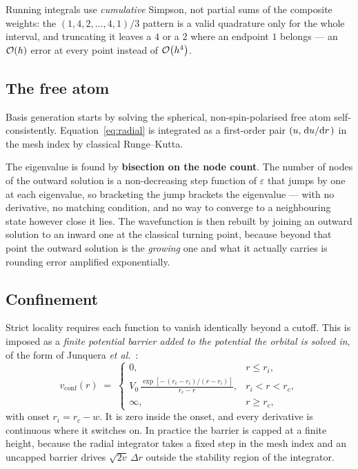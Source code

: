 \documentclass[11pt,a4paper]{article}
\begin{document}
Running integrals use \emph{cumulative} Simpson, not partial sums of the
composite weights: the $(1,4,2,\dots,4,1)/3$ pattern is a valid quadrature
only for the whole interval, and truncating it leaves a $4$ or a $2$ where an
endpoint $1$ belongs --- an $\order{h}$ error at every point instead of
$\order{h^4}$.

\subsection{The free atom}

Basis generation starts by solving the spherical, non-spin-polarised free atom
self-consistently. Equation~\eqref{eq:radial} is integrated as a first-order
pair $(u, \dv*{u}{r})$ in the mesh index by classical Runge--Kutta.

The eigenvalue is found by \textbf{bisection on the node count}. The number of
nodes of the outward solution is a non-decreasing step function of
$\varepsilon$ that jumps by one at each eigenvalue, so bracketing the jump
brackets the eigenvalue --- with no derivative, no matching condition, and no
way to converge to a neighbouring state however close it lies. The
wavefunction is then rebuilt by joining an outward solution to an inward one
at the classical turning point, because beyond that point the outward solution
is the \emph{growing} one and what it actually carries is rounding error
amplified exponentially.

\subsection{Confinement}
\label{sec:confinement}

Strict locality requires each function to vanish identically beyond a cutoff.
This is imposed as a \emph{finite potential barrier added to the potential the
orbital is solved in}, of the form of Junquera \emph{et al.}~\cite{junquera}:
\begin{equation}
  v_{\text{conf}}(r) \;=\;
  \begin{cases}
    0, & r \le r_i ,\\[4pt]
    \displaystyle
    V_0\,\frac{\exp\!\left[-\,(r_c - r_i)/(r - r_i)\right]}{r_c - r},
      & r_i < r < r_c ,\\[10pt]
    \infty, & r \ge r_c ,
  \end{cases}
  \label{eq:confine}
\end{equation}
with onset $r_i = r_c - w$. It is zero inside the onset, and every derivative
is continuous where it switches on. In practice the barrier is capped at a
finite height, because the radial integrator takes a fixed step in the mesh
index and an uncapped barrier drives $\sqrt{2v}\,\Delta r$ outside the
stability region of the integrator.
\end{document}

